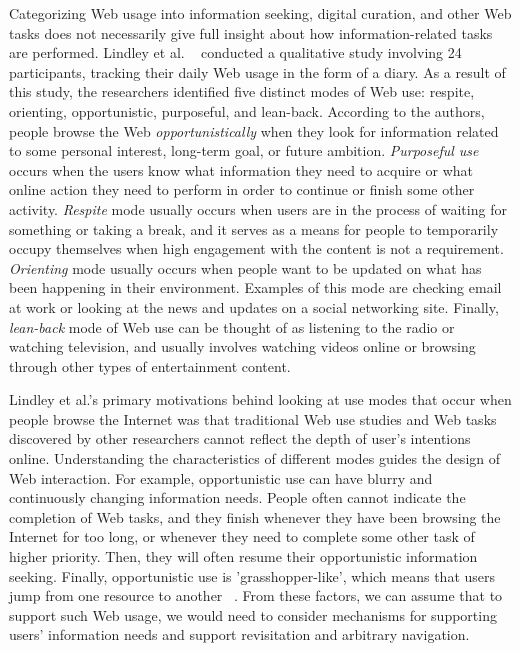 {{Categorizing Web usage into information seeking, digital curation, and other Web tasks does not necessarily give full insight about how information-related tasks are performed. Lindley et al. ~\cite{lindley} conducted a qualitative study involving 24 participants, tracking their daily Web usage in the form of a diary. As a result of this study, the researchers identified five distinct modes of Web use: respite, orienting, opportunistic, purposeful, and lean-back. According to the authors, people browse the Web \textit{opportunistically} when they look for information related to some personal interest, long-term goal, or future ambition. \textit{Purposeful use} occurs when the users know what information they need to acquire or what online action they need to perform in order to continue or finish some other activity. \textit{Respite} mode usually occurs when users are in the process of waiting for something or taking a break, and it serves as a means for people to temporarily occupy themselves when high engagement with the content is not a requirement. \textit{Orienting} mode usually occurs when people want to be updated on what has been happening in their environment. Examples of this mode are checking email at work or looking at the news and updates on a social networking site. Finally, \textit{lean-back} mode of Web use can be thought of as listening to the radio or watching television, and usually involves watching videos online or browsing through other types of entertainment content. 

Lindley et al.'s primary motivations behind looking at use modes that occur when people browse the Internet was that traditional Web use studies and Web tasks discovered by other researchers cannot reflect the depth of user's intentions online. Understanding the characteristics of different modes guides the design of Web interaction. For example, opportunistic use can have blurry and continuously changing information needs. People often cannot indicate the completion of Web tasks, and they finish whenever they have been browsing the Internet for too long, or whenever they need to complete some other task of higher priority. Then, they will often resume their opportunistic information seeking. Finally, opportunistic use is 'grasshopper-like', which means that users jump from one resource to another ~\cite{lindley}. From these factors, we can assume that to support such Web usage, we would need to consider mechanisms for supporting users' information needs and support revisitation and arbitrary navigation.

}}
